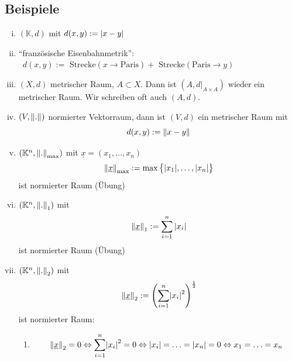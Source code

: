 \subsection[Beispiele für metrische Räume]{Beispiele} %
\label{sub:22}
\begin{enumerate}[(i)]
	\item $(\mathds{K},d)$ mit $d(x,y) := \abs*{x-y} $
	\item \enquote{französische Eisenbahnmetrik}: $\enspace d(x,y) := \text{ Strecke}(x \to \text{Paris}) + \text{ Strecke}(\text{Paris} \to y)$
	\begin{figure}[h]
	\end{figure}
	\item $(X,d)$ metrischer Raum, $A \subset X$. Dann ist $(A,d|_{A \times A})$ wieder ein metrischer Raum. Wir schreiben oft auch $(A,d)$.
	\item $(V, \norm[]{.} )$ normierter Vektorraum, dann ist $(V,d)$ ein metrischer Raum mit 
	\[
		d(x,y) := \norm[]{x-y} 
	\]
	\item $\enbrace*{\mathds{K}^n, \norm[\max]{.}}$ mit $\underline{x}=(x_1, \ldots , x_n)$ 
	\[
		\norm[\max]{\underline{x}} := \max \big\{ |x_1| , \ldots , |x_n|\big\}
	\]
	ist normierter Raum \hfill(Übung)
	\item $\enbrace*{\mathds{K}^n, \norm[1]{.} } $ mit 
	\[
		\norm[1]{\underline{x}} := \sum_{i=1}^{n} |x_i| 
	\] 
	ist normierter Raum \hfill (Übung)
	\item $\enbrace*{\mathds{K}^n, \norm[2]{.} } $ mit 
	\[
		\norm[2]{\underline{x}} := \enbrace*{\sum_{i=1}^{n} \abs*{x_i}^2}^{\frac{1}{2} }  
	\]
	ist normierter Raum:
	\begin{enumerate}[1.]
		\item \[
			\norm[2]{\underline{x}} = 0 \Leftrightarrow \sum_{i=1}^{n} \abs*{x_i}^2 = 0 \Leftrightarrow \abs*{x_i} = \ldots = \abs*{x_n} = 0  \Leftrightarrow x_1 = \ldots = x_n
\]
\end{enumerate}
\end{enumerate}
